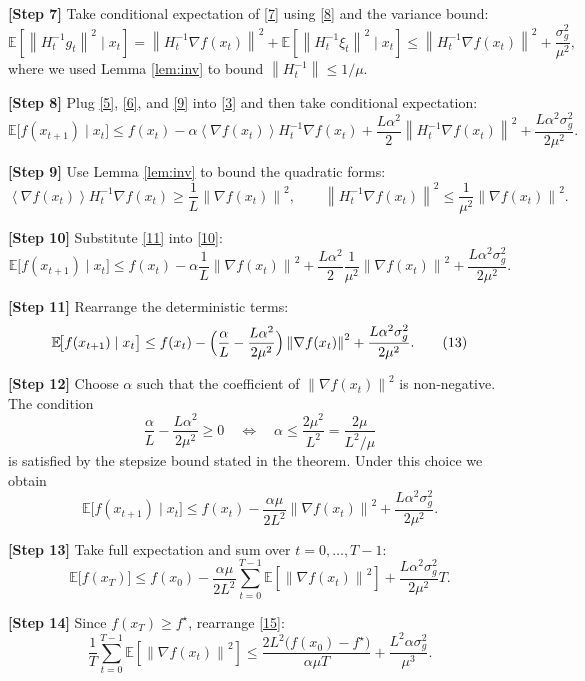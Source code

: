 \documentclass{article}
\newcommand{\EE}{\mathbb{E}}
\newcommand{\norm}[1]{\left\|#1\right\|}
\newcommand{\inner}[1]{\left\langle #1 \right\rangle}
\begin{document}
\noindent\textbf{[Step 7]} Take conditional expectation of \eqref{7} using \eqref{8} and the variance bound:
\[
\EE\!\left[\norm{H_t^{-1}g_t}^{2}\mid x_t\right]
= \norm{H_t^{-1}\nabla f(x_t)}^{2}
+\EE\!\left[\norm{H_t^{-1}\xi_t}^{2}\mid x_t\right]
\le \norm{H_t^{-1}\nabla f(x_t)}^{2}
+\frac{\sigma_g^{2}}{\mu^{2}}, \tag{9}
\]
where we used Lemma \ref{lem:inv} to bound $\norm{H_t^{-1}}\le 1/\mu$.

\noindent\textbf{[Step 8]} Plug \eqref{5}, \eqref{6}, and \eqref{9} into \eqref{3} and then take conditional expectation:
\[
\EE\!\bigl[f(x_{t+1})\mid x_t\bigr]
\le f(x_t)-\alpha\inner{\nabla f(x_t)}{H_t^{-1}\nabla f(x_t)}
+\frac{L\alpha^{2}}{2}\norm{H_t^{-1}\nabla f(x_t)}^{2}
+\frac{L\alpha^{2}\sigma_g^{2}}{2\mu^{2}}. \tag{10}
\]

\noindent\textbf{[Step 9]} Use Lemma \ref{lem:inv} to bound the quadratic forms:
\[
\inner{\nabla f(x_t)}{H_t^{-1}\nabla f(x_t)}\ge \frac{1}{L}\norm{\nabla f(x_t)}^{2},
\qquad
\norm{H_t^{-1}\nabla f(x_t)}^{2}\le \frac{1}{\mu^{2}}\norm{\nabla f(x_t)}^{2}. \tag{11}
\]

\noindent\textbf{[Step 10]} Substitute \eqref{11} into \eqref{10}:
\[
\EE\!\bigl[f(x_{t+1})\mid x_t\bigr]
\le f(x_t)-\alpha\frac{1}{L}\norm{\nabla f(x_t)}^{2}
+\frac{L\alpha^{2}}{2}\frac{1}{\mu^{2}}\norm{\nabla f(x_t)}^{2}
+\frac{L\alpha^{2}\sigma_g^{2}}{2\mu^{2}}. \tag{12}
\]

\noindent\textbf{[Step 11]} Rearrange the deterministic terms:
\[
\EE\!\bigl[f(x_{t+1})\mid x_t\bigr]
\le f(x_t)-\Bigl(\frac{\alpha}{L}-\frac{L\alpha^{2}}{2\mu^{2}}\Bigr)\norm{\nabla f(x_t)}^{2}
+\frac{L\alpha^{2}\sigma_g^{2}}{2\mu^{2}}. \tag{13}
\]

\noindent\textbf{[Step 12]} Choose $\alpha$ such that the coefficient of $\norm{\nabla f(x_t)}^{2}$ is non‑negative. The condition
\[
\frac{\alpha}{L}-\frac{L\alpha^{2}}{2\mu^{2}}\ge 0
\quad\Longleftrightarrow\quad
\alpha\le \frac{2\mu^{2}}{L^{2}}=\frac{2\mu}{L^{2}/\mu}
\]
is satisfied by the stepsize bound stated in the theorem. Under this choice we obtain
\[
\EE\!\bigl[f(x_{t+1})\mid x_t\bigr]
\le f(x_t)-\frac{\alpha\mu}{2L^{2}}\norm{\nabla f(x_t)}^{2}
+\frac{L\alpha^{2}\sigma_g^{2}}{2\mu^{2}}. \tag{14}
\]

\noindent\textbf{[Step 13]} Take full expectation and sum over $t=0,\dots,T-1$:
\[
\EE\!\bigl[f(x_T)\bigr]
\le f(x_0)-\frac{\alpha\mu}{2L^{2}}\sum_{t=0}^{T-1}\EE\!\left[\norm{\nabla f(x_t)}^{2}\right]
+\frac{L\alpha^{2}\sigma_g^{2}}{2\mu^{2}}T. \tag{15}
\]

\noindent\textbf{[Step 14]} Since $f(x_T)\ge f^\star$, rearrange \eqref{15}:
\[
\frac{1}{T}\sum_{t=0}^{T-1}\EE\!\left[\norm{\nabla f(x_t)}^{2}\right]
\le
\frac{2L^{2}\bigl(f(x_0)-f^\star\bigr)}{\alpha\mu T}
+\frac{L^{2}\alpha\sigma_g^{2}}{\mu^{3}}. \tag{16}
\]
\end{document}
